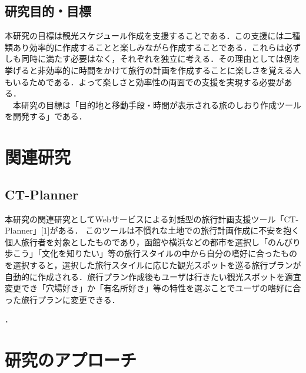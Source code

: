 \documentclass{funthesis}
\begin{document}
\section{研究目的・目標}

本研究の目標は観光スケジュール作成を支援することである．この支援には二種類あり効率的に作成することと楽しみながら作成することである．これらは必ずしも同時に満たす必要はなく，それぞれを独立に考える．その理由としては例を挙げると非効率的に時間をかけて旅行の計画を作成することに楽しさを覚える人もいるためである．よって楽しさと効率性の両面での支援を実現する必要がある．\\
　本研究の目標は「目的地と移動手段・時間が表示される旅のしおり作成ツールを開発する」である．


\chapter{関連研究}%

\section{CT-Planner}


本研究の関連研究としてWebサービスによる対話型の旅行計画支援ツール「CT-Planner」[1]がある．
このツールは不慣れな土地での旅行計画作成に不安を抱く個人旅行者を対象としたものであり，函館や横浜などの都市を選択し「のんびり歩こう」「文化を知りたい」等の旅行スタイルの中から自分の嗜好に合ったものを選択すると，選択した旅行スタイルに応じた観光スポットを巡る旅行プランが自動的に作成される．旅行プラン作成後もユーザは行きたい観光スポットを適宜変更でき「穴場好き」か「有名所好き」等の特性を選ぶことでユーザの嗜好に合った旅行プランに変更できる．


．


\chapter{研究のアプローチ}%
\end{document}
